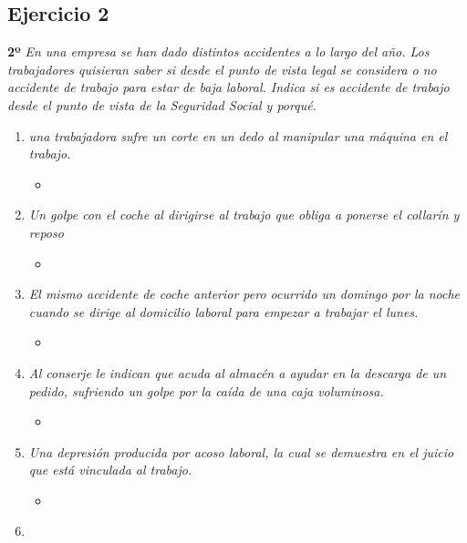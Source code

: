 \documentclass{article}
\begin{document}
      \subsection{Ejercicio 2}
        \textbf{2º} \textit{En una empresa se han dado distintos accidentes a lo largo del año. Los trabajadores quisieran saber si desde el 
        punto de vista legal se considera o no accidente de trabajo para estar de baja laboral. Indica si es accidente de trabajo desde el 
        punto de vista de la Seguridad Social y porqué.}
        \\
        \begin{enumerate}[label=(\alph*)]
          \item \textit{una trabajadora sufre un corte en un dedo al manipular una máquina en el trabajo.}
            \begin{itemize}
              \item 
            \end{itemize}
          \item \textit{Un golpe con el coche al dirigirse al trabajo que obliga a ponerse el collarín y reposo}
            \begin{itemize}
              \item 
            \end{itemize}
          \item \textit{El mismo accidente de coche anterior pero ocurrido un domingo por la noche cuando se dirige al domicilio laboral para empezar a trabajar el lunes.}
            \begin{itemize}
              \item 
            \end{itemize}
          \item \textit{Al conserje le indican que acuda al almacén a ayudar en la descarga de un pedido, sufriendo un golpe por la caída de una caja voluminosa.}
            \begin{itemize}
              \item 
            \end{itemize}
          \item \textit{Una depresión producida por acoso laboral, la cual se demuestra en el juicio que está vinculada al trabajo.}
            \begin{itemize}
              \item 
            \end{itemize}
          \item \textit{}
            \begin{itemize}

\end{itemize}
\end{enumerate}
\end{document}
